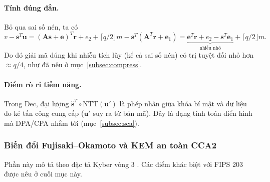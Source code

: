 \documentclass[../LuanVan.tex]{subfiles}
\begin{document}
\begin{center}
\end{center}

\paragraph{Tính đúng đắn.} Bỏ qua sai số nén, ta có
\begin{equation}
    v-\mathbf{s}^{T}\mathbf{u}
    = (\mathbf{A}\mathbf{s}+\mathbf{e})^{T}\mathbf{r}+e_2+\lceil q/2\rfloor m-\mathbf{s}^{T}(\mathbf{A}^{T}\mathbf{r}+\mathbf{e}_1)
    = \underbrace{\mathbf{e}^{T}\mathbf{r}+e_2-\mathbf{s}^{T}\mathbf{e}_1}_{\text{nhiễu nhỏ}}+\lceil q/2\rfloor m .
\end{equation}
Do đó giải mã đúng khi nhiễu tích lũy (kể cả sai số nén) có trị tuyệt đối nhỏ hơn $\approx q/4$, như đã nêu ở mục~\ref{subsec:compress}.

\paragraph{Điểm rò rỉ tiềm năng.} Trong $\mathrm{Dec}$, đại lượng $\hat{\mathbf{s}}^{T}\circ\mathrm{NTT}(\mathbf{u}')$ là phép nhân giữa khóa bí mật và dữ liệu do kẻ tấn công cung cấp ($\mathbf{u}'$ suy ra từ bản mã). Đây là dạng tính toán điển hình mà DPA/CPA nhắm tới (mục~\ref{subsec:sca}).

\subsubsection{Biến đổi Fujisaki--Okamoto và KEM an toàn CCA2}\label{subsec:fo}

Phần này mô tả theo đặc tả Kyber vòng 3 \cite{Avanzi21}. Các điểm khác biệt với FIPS 203 được nêu ở cuối mục này.
\end{document}
